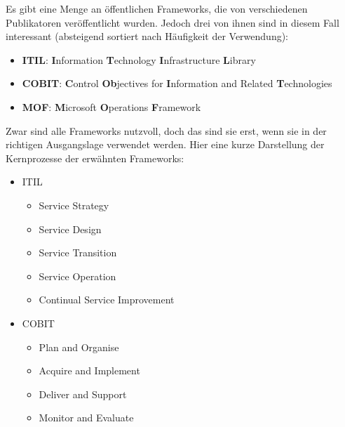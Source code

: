 Es gibt eine Menge an öffentlichen Frameworks, die von verschiedenen Publikatoren
veröffentlicht wurden. Jedoch drei von ihnen sind in diesem Fall interessant 
(absteigend sortiert nach Häufigkeit der Verwendung):
\newline
\begin{itemize}
    \item \textbf{ITIL}:  \textbf{I}nformation \textbf{T}echnology \textbf{I}nfrastructure
                          \textbf{L}ibrary
    \item \textbf{COBIT}: \textbf{C}ontrol \textbf{Ob}jectives for \textbf{I}nformation 
                          and Related \textbf{T}echnologies
    \item \textbf{MOF}:   \textbf{M}icrosoft \textbf{O}perations \textbf{F}ramework
\end{itemize}
\noindent
\newline
Zwar sind alle Frameworks nutzvoll, doch das sind sie erst, wenn sie in der richtigen
Ausgangslage verwendet werden. 
\newline
Hier eine kurze Darstellung der Kernprozesse der erwähnten Frameworks:

\begin{itemize}
    \item ITIL
    \begin{itemize}
        \item Service Strategy
        \item Service Design
        \item Service Transition
        \item Service Operation
        \item Continual Service Improvement
    \end{itemize}
    \item COBIT
    \begin{itemize}
        \item Plan and Organise
        \item Acquire and Implement
        \item Deliver and Support
        \item Monitor and Evaluate
    \end{itemize}
\end{itemize}



